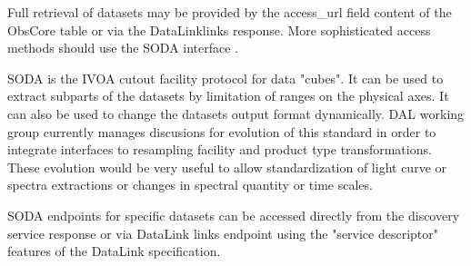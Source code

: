 \documentclass[11pt,a4paper]{ivoa}
\begin{document}
 Full retrieval of datasets may be provided by the access\_url field content of the ObsCore table or via the DataLink{links} response. More sophisticated access methods should use the SODA interface \citep{2017ivoa.spec.0517B}.
   
 SODA   is the IVOA cutout facility protocol for data "cubes".  It can be used to extract subparts of the datasets by limitation of ranges on the physical axes. It can also be used to change the datasets output format dynamically. DAL working group currently manages discusions for evolution of this standard in order to integrate interfaces to resampling facility and product type transformations. These evolution would be very useful to allow standardization of light curve or spectra extractions or changes in spectral quantity or time scales.    
 
 SODA endpoints for specific datasets can be accessed directly from the discovery service response or via DataLink {links} endpoint using the "service descriptor" features of the DataLink specification.  
\end{document}
